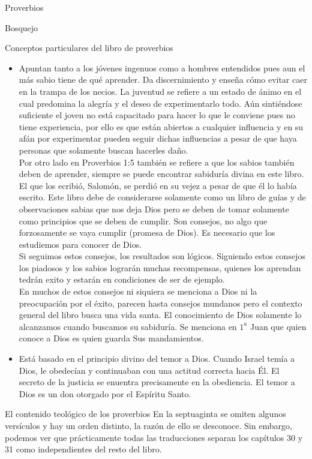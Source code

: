 \begin{section}{Proverbios}
\begin{subsection}{Bosquejo}
\begin{subsubsection}{Conceptos particulares del libro de proverbios}
\begin{itemize}
					\item Apuntan tanto a los jóvenes ingenuos como a hombres entendidos pues aun el más sabio tiene de qué aprender. Da discernimiento y enseña cómo evitar caer en la trampa de los necios. La juventud se refiere a un estado de ánimo en el cual predomina la alegría y el deseo de experimentarlo todo. Aún sintiéndose suficiente el joven no está capacitado para hacer lo que le conviene pues no tiene experiencia, por ello es que están abiertos a cualquier influencia y en su afán por experimentar pueden seguir dichas influencias a pesar de que haya personas que solamente buscan hacerles daño.\\
						Por otro lado en Proverbios 1:5 también se refiere a que los sabios también deben de aprender, siempre se puede encontrar sabiduría divina en este libro. El que los ecribió, Salomón, se perdió en su vejez a pesar de que él lo había escrito. Este libro debe de considerarse solamente como un libro de guías y de observaciones sabias que nos deja Dios pero se deben de tomar solamente como principios que se deben de cumplir. Son consejos, no algo que forzosamente se vaya cumplir (promesa de Dios). Es necesario que los estudiemos para conocer de Dios.\\
						Si seguimos estos consejos, los resultados son lógicos. Siguiendo estos consejos los piadosos y los sabios lograrán muchas recompensas, quienes los aprendan tedrán exito y estarán en condiciones de ser de ejemplo.\\
						En muchos de estos consejos ni siquiera se menciona a Dios ni la preocupación por el éxito, parecen hasta consejos mundanos pero el contexto general del libro busca una vida santa. El conocimiento de Dios solamente lo alcanzamos cuando buscamos su sabiduría. Se menciona en $1^{a}$ Juan que quien conoce a Dios es quien guarda Sus mandamientos.
						\newpage
					\item Está basado en el principio divino del temor a Dios. Cuando Israel temía a Dios, le obedecían y continuaban con una actitud correcta hacia Él. El secreto de la justicia se enuentra precisamente en la obediencia. El temor a Dios es un don otorgado por el Espíritu Santo.
				\end{itemize}
			\end{subsubsection}
			\begin{subsubsection}{El contenido teológico de los proverbios}
				En la septuaginta se omiten algunos versículos y hay un orden distinto, la razón de ello se desconoce. Sin embargo, podemos ver que prácticamente todas las traducciones separan los capítulos 30 y 31 como independientes del resto del libro.\\

\end{subsubsection}
\end{subsection}
\end{section}
